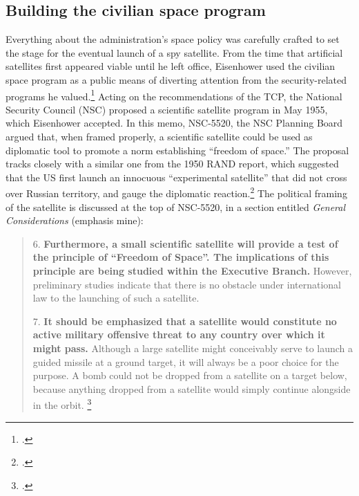 \documentclass{report}
\begin{document}
\subsection{Building the civilian space program}
Everything about the administration's space policy was carefully crafted to set the stage for the eventual launch of a spy satellite. From the time that artificial satellites first appeared viable until he left office, Eisenhower used the civilian space program as a public means of diverting attention from the security-related programs he valued.\footcite[p.~119]{day_eye_2015} Acting on the recommendations of the TCP, the National Security Council (NSC) proposed a scientific satellite program in May 1955, which Eisenhower accepted. In this memo, NSC-5520, the NSC Planning Board argued that, when framed properly, a scientific satellite could be used as diplomatic tool to promote a norm establishing ``freedom of space.'' The proposal tracks closely with a similar one from the 1950 RAND report, which suggested that the US first launch an innocuous ``experimental satellite'' that did not cross over Russian territory, and gauge the diplomatic reaction.\footcite[p.~21]{kecskemetic_satellite_1950} The political framing of the satellite is discussed at the top of NSC-5520, in a section entitled \emph{General Considerations} (emphasis mine):

\begin{quote}
	6. \textelp{} \textbf{Furthermore, a small scientific satellite will provide a test of the principle of “Freedom of Space”. The implications of this principle are being studied within the Executive Branch.} However, preliminary studies indicate that there is no obstacle under international law to the launching of such a satellite.

	7. \textbf{It should be emphasized that a satellite would constitute no active military offensive threat to any country over which it might pass.} Although a large satellite might conceivably serve to launch a guided missile at a ground target, it will always be a poor choice for the purpose. A bomb could not be dropped from a satellite on a target below, because anything dropped from a satellite would simply continue alongside in the orbit. \footcite{nsc_planning_board_draft_1955}
\end{quote}
\end{document}
